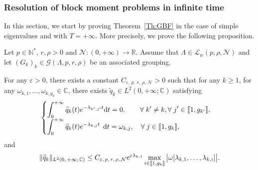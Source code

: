 \documentclass[10pt]{amsart}
\theoremstyle{definition}\newtheorem{defi}[theo]{Definition}\newtheorem{rema}[theo]{Remark}\newtheorem{exam}[theo]{Example}\newtheorem{exem}[theo]{Example}\newtheorem{nota}[theo]{Notation}
\newcommand{\llbracket}{\mathopen{[\mkern -2.7mu[}}
\newcommand{\rrbracket}{\mathclose{]\mkern -2.7mu]}}
\newcommand{\inter}[2]{\llbracket #1,#2 \rrbracket}
\newcommand{\n}{g}
\newcommand{\LL}{\mathcal{L}}
\newcommand{\NN}{\mathcal{N}}
\newcommand{\N}{\mathbb{N}}
\newcommand{\R}{\mathbb{R}}
\newcommand{\C}{\mathbb{C}}
\newcommand{\md}{\mathrm{d}}
\let\oldforall\forall
\renewcommand*{\forall}{\mathrel{\oldforall}}
\begin{document}
\subsubsection{Resolution of block moment problems in infinite time} \label{sec:BBM_infinite}

In this section, we start by proving Theorem~\ref{Th:GBF} in the case of simple eigenvalues and with $T=+\infty$. More precisely, we prove the following proposition.

\begin{prop}\label{Prop:GBF_Infini}
Let $p \in \N^*$, $r, \rho > 0$ and $\NN : (0,+\infty) \to \R$. Assume that $\Lambda \in \LL_w(p,\rho, \NN)$ and let $(G_k)_k\in \mathcal{G}(\Lambda,p,r,\rho)$ be an associated grouping.

For any $\varepsilon > 0$, there exists a constant $C_{\varepsilon,\,p,\,r,\,\rho,\,\NN} >0$ such that for any $k \geq 1$, for any $\omega_{k,1}, \dots, \omega_{k, \n_k} \in \C$, there exists $\widetilde{q}_k \in L^2(0,+\infty; \C)$ satisfying
\begin{equation}\label{GBF_Infini_quelconque}
\begin{cases}
\displaystyle\int_0^{+\infty} \widetilde{q}_k(t) e^{-\lambda_{k',j'} t } \md t = 0, \mkern36mu \forall k' \neq k, \forall j' \in \inter{1}{\n_{k'}},
\\[0.15em]
\displaystyle\int_0^{+\infty} \widetilde{q}_k(t) e^{-\lambda_{k,j} t } \;\,\md t = \omega_{k,j}, \quad \forall j \in \inter{1}{\n_k},
\end{cases}
\end{equation}
and
\begin{equation*}\label{Estimee_GBF_Infini}
\| \widetilde{q}_k \|_{L^2(0,\,+\infty ;\,\C)} \leq C_{\varepsilon,\,p,\,r,\,\rho,\,\NN} e^{\varepsilon \lambda_{k,1}} \max \limits_{i\in \inter{1}{\n_k}} \big| \omega[\lambda_{k,1}, \dots, \lambda_{k,i}] \big|.
\end{equation*}
\end{prop}
\end{document}
